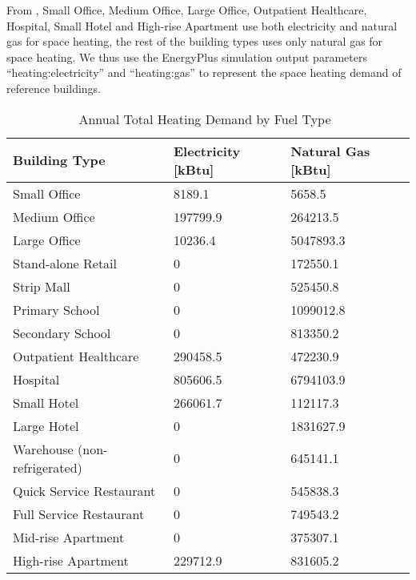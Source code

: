 From , Small Office, Medium Office, Large Office,
Outpatient Healthcare, Hospital, Small Hotel and High-rise Apartment
use both electricity and natural gas for space heating, the rest of
the building types uses only natural gas for space heating. We thus
use the EnergyPlus simulation output parameters
``heating:electricity'' and ``heating:gas'' to represent the space
heating demand of reference buildings.
\begin{table}[h]
\centering
\caption{Annual Total Heating Demand by Fuel Type~\cite{DOE2015}}
\label{tab:heatFuel}
\begin{tabular}{lll}
  \hline
  Building Type                & Electricity {[}kBtu{]} & Natural Gas {[}kBtu{]} \\
  \hline
  \hline
  
  Small Office                 & 8189.1                 & 5658.5                 \\
  Medium Office                & 197799.9               & 264213.5               \\
  Large Office                 & 10236.4                & 5047893.3              \\
  Stand-alone Retail           & 0                      & 172550.1               \\
  Strip Mall                   & 0                      & 525450.8               \\
  Primary School               & 0                      & 1099012.8              \\
  Secondary School             & 0                      & 813350.2               \\
  Outpatient Healthcare        & 290458.5               & 472230.9               \\
  Hospital                     & 805606.5               & 6794103.9              \\
  Small Hotel                  & 266061.7               & 112117.3               \\
  Large Hotel                  & 0                      & 1831627.9              \\
  Warehouse (non-refrigerated) & 0                      & 645141.1               \\
  Quick Service Restaurant     & 0                      & 545838.3               \\
  Full Service Restaurant      & 0                      & 749543.2               \\
  Mid-rise Apartment           & 0                      & 375307.1               \\
  High-rise Apartment          & 229712.9               & 831605.2               \\
  \hline
\end{tabular}
\end{table}

